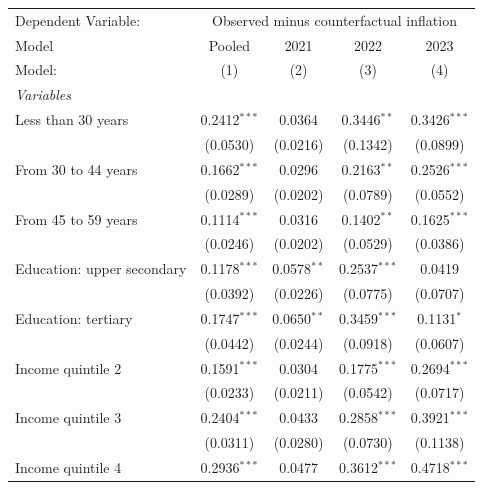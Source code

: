 
\begingroup
\centering
\begin{tabular}{lcccc}
   \tabularnewline \midrule \midrule
   Dependent Variable: & \multicolumn{4}{c}{Observed minus counterfactual inflation}\\
   Model                      & Pooled         & 2021          & 2022           & 2023 \\   
   Model:                     & (1)            & (2)           & (3)            & (4)\\  
   \midrule
   \emph{Variables}\\
   Less than 30 years         & 0.2412$^{***}$ & 0.0364        & 0.3446$^{**}$  & 0.3426$^{***}$\\   
                              & (0.0530)       & (0.0216)      & (0.1342)       & (0.0899)\\   
   From 30 to 44 years        & 0.1662$^{***}$ & 0.0296        & 0.2163$^{**}$  & 0.2526$^{***}$\\   
                              & (0.0289)       & (0.0202)      & (0.0789)       & (0.0552)\\   
   From 45 to 59 years        & 0.1114$^{***}$ & 0.0316        & 0.1402$^{**}$  & 0.1625$^{***}$\\   
                              & (0.0246)       & (0.0202)      & (0.0529)       & (0.0386)\\   
   Education: upper secondary & 0.1178$^{***}$ & 0.0578$^{**}$ & 0.2537$^{***}$ & 0.0419\\   
                              & (0.0392)       & (0.0226)      & (0.0775)       & (0.0707)\\   
   Education: tertiary        & 0.1747$^{***}$ & 0.0650$^{**}$ & 0.3459$^{***}$ & 0.1131$^{*}$\\   
                              & (0.0442)       & (0.0244)      & (0.0918)       & (0.0607)\\   
   Income quintile 2          & 0.1591$^{***}$ & 0.0304        & 0.1775$^{***}$ & 0.2694$^{***}$\\   
                              & (0.0233)       & (0.0211)      & (0.0542)       & (0.0717)\\   
   Income quintile 3          & 0.2404$^{***}$ & 0.0433        & 0.2858$^{***}$ & 0.3921$^{***}$\\   
                              & (0.0311)       & (0.0280)      & (0.0730)       & (0.1138)\\   
   Income quintile 4          & 0.2936$^{***}$ & 0.0477        & 0.3612$^{***}$ & 0.4718$^{***}$\\   

\end{tabular}
